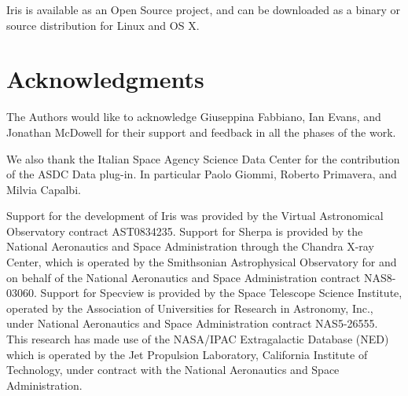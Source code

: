 \documentclass[final,5p,authoryear]{elsarticle}
\begin{document}
Iris is available as an Open Source project, and can be downloaded as a binary
or source distribution for Linux and OS X.


\section*{Acknowledgments}
The Authors would like to acknowledge Giuseppina Fabbiano, Ian Evans,
and Jonathan McDowell
for their support and feedback in all the phases of the work.

We also thank the Italian Space Agency Science Data Center for the contribution
of the ASDC Data plug-in. In particular Paolo Giommi, Roberto Primavera, and
Milvia Capalbi.

Support for the development of Iris was provided by
the Virtual Astronomical Observatory contract AST0834235. Support for Sherpa is
provided by the National Aeronautics and Space Administration through the
Chandra X-ray Center, which is operated by the Smithsonian Astrophysical
Observatory for and on behalf of the National Aeronautics and Space
Administration contract NAS8-03060.  Support for Specview is provided by the
Space Telescope Science Institute, operated by the Association of Universities
for Research in Astronomy, Inc., under National Aeronautics and Space
Administration contract NAS5-26555. This research has made use of the NASA/IPAC
Extragalactic Database (NED) which is operated by the Jet Propulsion Laboratory,
California Institute of Technology, under contract with the National Aeronautics
and Space Administration.


\end{document}

